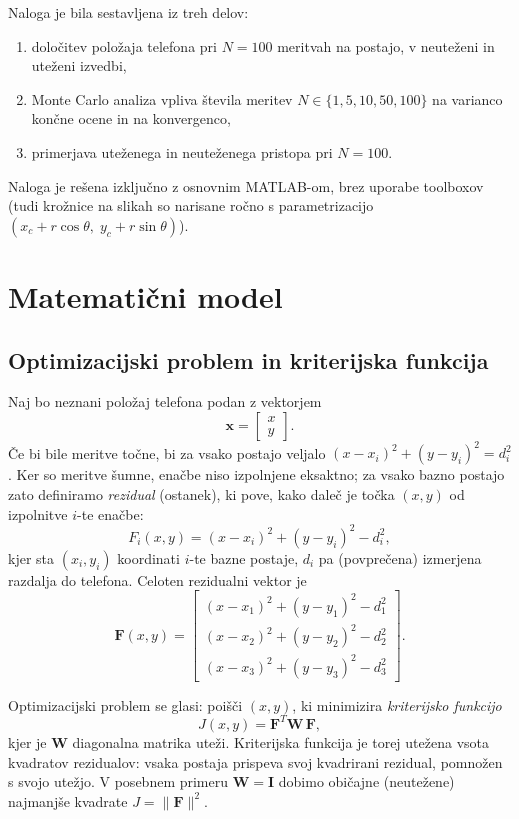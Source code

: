 \documentclass[a4paper,11pt]{article}
\begin{document}
Naloga je bila sestavljena iz treh delov:
\begin{enumerate}
    \item določitev položaja telefona pri $N=100$ meritvah na postajo, v neuteženi in uteženi izvedbi,
    \item Monte Carlo analiza vpliva števila meritev $N \in \{1,5,10,50,100\}$ na varianco končne ocene in na konvergenco,
    \item primerjava uteženega in neuteženega pristopa pri $N=100$.
\end{enumerate}
Naloga je rešena izključno z osnovnim MATLAB-om, brez uporabe toolboxov (tudi krožnice na slikah so narisane ročno s parametrizacijo $(x_c + r\cos\theta,\; y_c + r\sin\theta)$).

\section{Matematični model}

\subsection{Optimizacijski problem in kriterijska funkcija}
Naj bo neznani položaj telefona podan z vektorjem
\[
\mathbf{x} = \begin{bmatrix} x \\ y \end{bmatrix}.
\]
Če bi bile meritve točne, bi za vsako postajo veljalo $(x-x_i)^2 + (y-y_i)^2 = d_i^2$. Ker so meritve šumne, enačbe niso izpolnjene eksaktno; za vsako bazno postajo zato definiramo \emph{rezidual} (ostanek), ki pove, kako daleč je točka $(x,y)$ od izpolnitve $i$-te enačbe:
\[
F_i(x,y) = (x-x_i)^2 + (y-y_i)^2 - d_i^2,
\]
kjer sta $(x_i,y_i)$ koordinati $i$-te bazne postaje, $d_i$ pa (povprečena) izmerjena razdalja do telefona. Celoten rezidualni vektor je
\[
\mathbf{F}(x,y)=
\begin{bmatrix}
(x-x_1)^2+(y-y_1)^2-d_1^2 \\
(x-x_2)^2+(y-y_2)^2-d_2^2 \\
(x-x_3)^2+(y-y_3)^2-d_3^2
\end{bmatrix}.
\]

Optimizacijski problem se glasi: poišči $(x,y)$, ki minimizira \emph{kriterijsko funkcijo}
\begin{equation}
J(x,y) = \mathbf{F}^T \mathbf{W}\, \mathbf{F},
\label{eq:kriterij}
\end{equation}
kjer je $\mathbf{W}$ diagonalna matrika uteži. Kriterijska funkcija je torej utežena vsota kvadratov rezidualov: vsaka postaja prispeva svoj kvadrirani rezidual, pomnožen s svojo utežjo. V posebnem primeru $\mathbf{W}=\mathbf{I}$ dobimo običajne (neutežene) najmanjše kvadrate $J = \|\mathbf{F}\|^2$.
\end{document}
